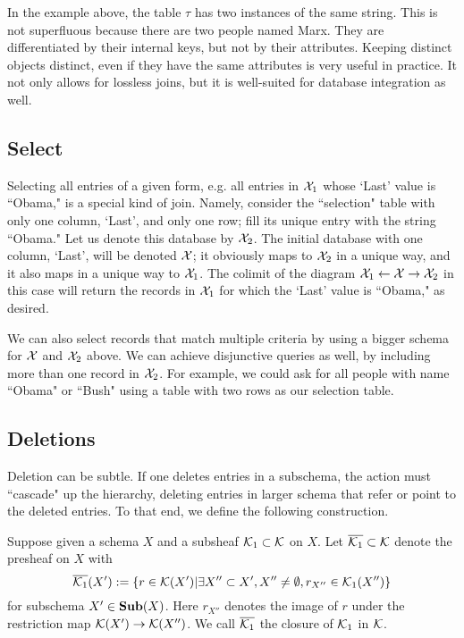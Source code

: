 \documentclass{amsart}
\def\Sub{{\bf Sub}}
\begin{document}
In the example above, the table $\tau$ has two instances of the same string.  This is not superfluous because there are two people named Marx.  They are differentiated by their internal keys, but not by their attributes.  Keeping distinct objects distinct, even if they have the same attributes is very useful in practice.  It not only allows for lossless joins, but it is well-suited for database integration as well.

\subsection{Select}\label{subsec:select}

Selecting all entries of a given form, e.g. all entries in $\mathcal{X}_1$ whose `Last' value is ``Obama," is a special kind of join.  Namely, consider the ``selection" table with only one column, `Last', and only one row; fill its unique entry with the string ``Obama."  Let us denote this database by $\mathcal{X}_2$.  The initial database with one column, `Last', will be denoted $\mathcal{X}$; it obviously maps to $\mathcal{X}_2$ in a unique way, and it also maps in a unique way to $\mathcal{X}_1$.  The colimit of the diagram $\mathcal{X}_1\leftarrow\mathcal{X}\rightarrow\mathcal{X}_2$ in this case will return the records in $\mathcal{X}_1$ for which the `Last' value is ``Obama," as desired.

We can also select records that match multiple criteria by using a bigger schema for $\mathcal{X}$ and $\mathcal{X}_2$ above.  We can achieve disjunctive queries as well, by including more than one record in $\mathcal{X}_2$.  For example, we could ask for all people with name ``Obama" or ``Bush" using a table with two rows as our selection table. 

\subsection{Deletions}

Deletion can be subtle.  If one deletes entries in a subschema, the action must ``cascade" up the hierarchy, deleting entries in larger schema that refer or point to the deleted entries.  To that end, we define the following construction.  

\begin{definition}

Suppose given a schema $X$ and a subsheaf $\mathcal{K}_1\subset\mathcal{K}$ on $X$.  Let $\overline{\mathcal{K}_1}\subset\mathcal{K}$ denote the presheaf on $X$ with $$\overline{\mathcal{K}_1}(X'):=\{r\in\mathcal{K}(X')|\exists X''\subset X', X''\neq\emptyset, r_{X''}\in\mathcal{K}_1(X'')\}$$ for subschema $X'\in\Sub(X)$.  Here $r_{X''}$ denotes the image of $r$ under the restriction map $\mathcal{K}(X')\rightarrow\mathcal{K}(X'')$.  We call $\overline{\mathcal{K}_1}$ the closure of $\mathcal{K}_1$ in $\mathcal{K}$.

\end{definition}
\end{document}
